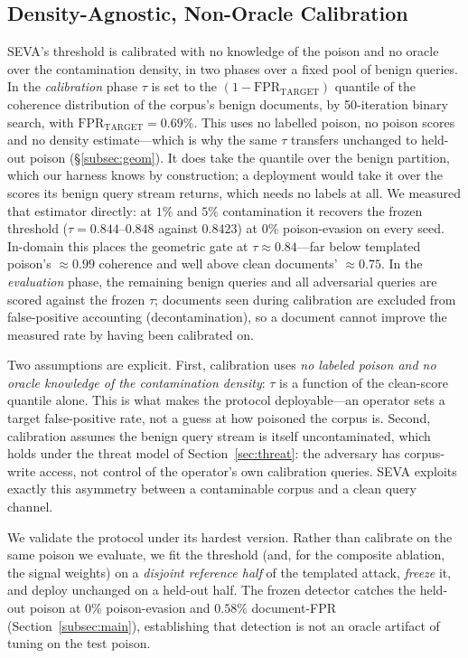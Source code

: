\documentclass[10pt,journal,compsoc]{IEEEtran}
\begin{document}
\subsection{Density-Agnostic, Non-Oracle Calibration}
SEVA's threshold is calibrated with no knowledge of the poison and no oracle over the
contamination density, in two phases over a fixed pool of benign queries. In the
\emph{calibration} phase $\tau$ is set to the $(1-\mathrm{FPR}_{\mathrm{TARGET}})$ quantile of
the coherence distribution of the corpus's benign documents, by 50-iteration binary search, with
$\mathrm{FPR}_{\mathrm{TARGET}}=0.69\%$. This uses no labelled poison, no poison scores and no
density estimate---which is why the same $\tau$ transfers unchanged to held-out poison
(\S\ref{subsec:geom}). It does take the quantile over the benign partition, which our harness
knows by construction; a deployment would take it over the scores its benign query stream
returns, which needs no labels at all. We measured that estimator directly: at $1\%$ and $5\%$
contamination it recovers the frozen threshold ($\tau=0.844$--$0.848$ against $0.8423$) at $0\%$
poison-evasion on every seed. In-domain this places the geometric gate at
$\tau\approx0.84$---far below templated poison's $\approx\!0.99$ coherence and well
above clean documents' $\approx\!0.75$. In the \emph{evaluation} phase, the
remaining benign queries and all adversarial queries are scored against the frozen
$\tau$; documents seen during calibration are excluded from false-positive
accounting (decontamination), so a document cannot improve the measured rate by
having been calibrated on.

Two assumptions are explicit. First, calibration uses \emph{no labeled poison and
no oracle knowledge of the contamination density}: $\tau$ is a function of the
clean-score quantile alone. This is what makes the protocol deployable---an operator
sets a target false-positive rate, not a guess at how poisoned the corpus is.
Second, calibration assumes the benign query stream is itself uncontaminated, which
holds under the threat model of Section~\ref{sec:threat}: the adversary has
corpus-write access, not control of the operator's own calibration queries. SEVA
exploits exactly this asymmetry between a contaminable corpus and a clean query
channel.

We validate the protocol under its hardest version. Rather than calibrate on the
same poison we evaluate, we fit the threshold (and, for the composite ablation, the
signal weights) on a \emph{disjoint reference half} of the templated attack,
\emph{freeze} it, and deploy unchanged on a held-out half. The frozen detector
catches the held-out poison at $0\%$ poison-evasion and $0.58\%$ document-FPR
(Section~\ref{subsec:main}), establishing that detection is not an oracle artifact
of tuning on the test poison.
\end{document}
